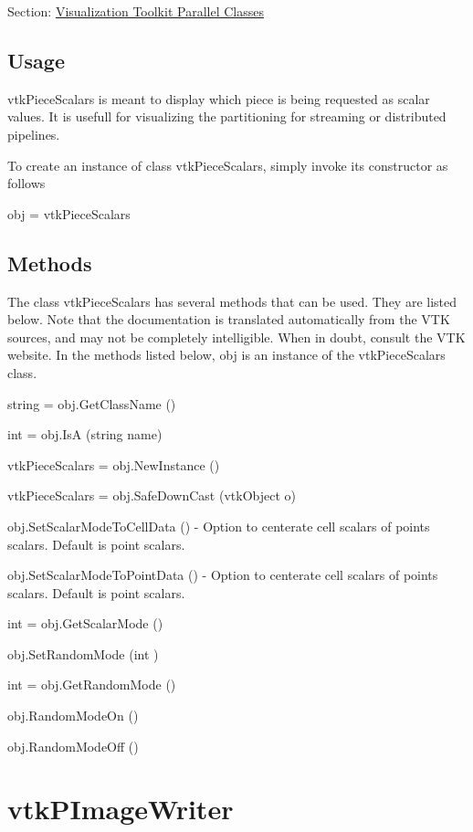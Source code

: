 Section\-: \hyperlink{sec_vtkparallel}{Visualization Toolkit Parallel Classes} \hypertarget{vtkwidgets_vtkxyplotwidget_Usage}{}\subsection{Usage}\label{vtkwidgets_vtkxyplotwidget_Usage}
vtk\-Piece\-Scalars is meant to display which piece is being requested as scalar values. It is usefull for visualizing the partitioning for streaming or distributed pipelines.

To create an instance of class vtk\-Piece\-Scalars, simply invoke its constructor as follows \begin{DoxyVerb}  obj = vtkPieceScalars
\end{DoxyVerb}
 \hypertarget{vtkwidgets_vtkxyplotwidget_Methods}{}\subsection{Methods}\label{vtkwidgets_vtkxyplotwidget_Methods}
The class vtk\-Piece\-Scalars has several methods that can be used. They are listed below. Note that the documentation is translated automatically from the V\-T\-K sources, and may not be completely intelligible. When in doubt, consult the V\-T\-K website. In the methods listed below, {\ttfamily obj} is an instance of the vtk\-Piece\-Scalars class. 
\begin{DoxyItemize}
\item {\ttfamily string = obj.\-Get\-Class\-Name ()}  
\item {\ttfamily int = obj.\-Is\-A (string name)}  
\item {\ttfamily vtk\-Piece\-Scalars = obj.\-New\-Instance ()}  
\item {\ttfamily vtk\-Piece\-Scalars = obj.\-Safe\-Down\-Cast (vtk\-Object o)}  
\item {\ttfamily obj.\-Set\-Scalar\-Mode\-To\-Cell\-Data ()} -\/ Option to centerate cell scalars of points scalars. Default is point scalars.  
\item {\ttfamily obj.\-Set\-Scalar\-Mode\-To\-Point\-Data ()} -\/ Option to centerate cell scalars of points scalars. Default is point scalars.  
\item {\ttfamily int = obj.\-Get\-Scalar\-Mode ()}  
\item {\ttfamily obj.\-Set\-Random\-Mode (int )}  
\item {\ttfamily int = obj.\-Get\-Random\-Mode ()}  
\item {\ttfamily obj.\-Random\-Mode\-On ()}  
\item {\ttfamily obj.\-Random\-Mode\-Off ()}  
\end{DoxyItemize}\hypertarget{vtkparallel_vtkpimagewriter}{}\section{vtk\-P\-Image\-Writer}\label{vtkparallel_vtkpimagewriter}
